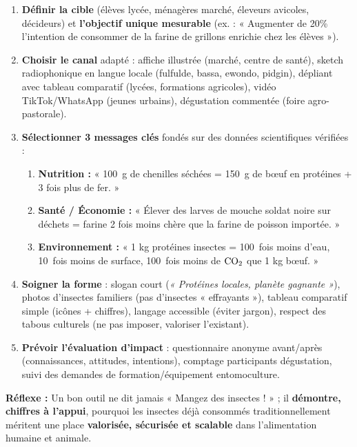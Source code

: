 \documentclass[11pt]{article}
\begin{document}
\begin{methode}
\begin{enumerate}
\item \textbf{Définir la cible} (élèves lycée, ménagères marché, éleveurs avicoles, décideurs) et \textbf{l'objectif unique mesurable} (ex. : « Augmenter de 20\% l'intention de consommer de la farine de grillons enrichie chez les élèves »).
\item \textbf{Choisir le canal} adapté : affiche illustrée (marché, centre de santé), sketch radiophonique en langue locale (fulfulde, bassa, ewondo, pidgin), dépliant avec tableau comparatif (lycées, formations agricoles), vidéo TikTok/WhatsApp (jeunes urbains), dégustation commentée (foire agro-pastorale).
\item \textbf{Sélectionner 3 messages clés} fondés sur des données scientifiques vérifiées :
\begin{enumerate}
\item \textbf{Nutrition :} « \SI{100}{g} de chenilles séchées = \SI{150}{g} de bœuf en protéines + 3 fois plus de fer. »
\item \textbf{Santé / Économie :} « Élever des larves de mouche soldat noire sur déchets = farine 2 fois moins chère que la farine de poisson importée. »
\item \textbf{Environnement :} « 1 kg protéines insectes = \SI{100}{fois} moins d'eau, \SI{10}{fois} moins de surface, \SI{100}{fois} moins de $\ce{CO2}$ que 1 kg bœuf. »
\end{enumerate}
\item \textbf{Soigner la forme} : slogan court (\emph{« Protéines locales, planète gagnante »}), photos d'insectes familiers (pas d'insectes « effrayants »), tableau comparatif simple (icônes + chiffres), langage accessible (éviter jargon), respect des tabous culturels (ne pas imposer, valoriser l'existant).
\item \textbf{Prévoir l'évaluation d'impact} : questionnaire anonyme avant/après (connaissances, attitudes, intentions), comptage participants dégustation, suivi des demandes de formation/équipement entomoculture.
\end{enumerate}
\textbf{Réflexe :} Un bon outil ne dit jamais « Mangez des insectes ! » ; il \textbf{démontre, chiffres à l'appui}, pourquoi les insectes déjà consommés traditionnellement méritent une place \textbf{valorisée, sécurisée et scalable} dans l'alimentation humaine et animale.
\end{methode}
\end{document}
